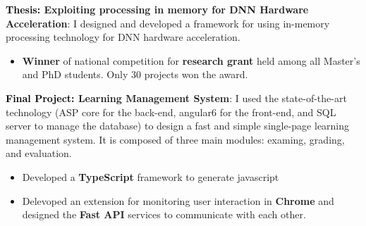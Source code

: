 \documentclass[10pt,a4paper,ragged2e,withhyper]{files/altacv}
\begin{document}
\begin{paracol}{2}


    \textbf{\textcolor{3}{Thesis:} Exploiting processing in memory for DNN Hardware Acceleration}: I designed and developed a framework for using in-memory processing technology for DNN hardware acceleration.
    
\begin{itemize}    
    \item \textbf{Winner} of national competition for \textbf{research grant} held among all Master's and PhD students. Only 30 projects won the award.
    
\end{itemize}
\divider


    \textbf{\textcolor{3}{Final Project:} Learning Management System}: I used the state-of-the-art technology (ASP core for the back-end, angular6 for the front-end, and SQL server to manage the database) to design a fast and simple single-page learning management system. It is composed of three main modules: examing, grading, and evaluation.





\begin{itemize}

\item Developed a \textbf{TypeScript} framework to generate javascript
\item Delevoped an extension for monitoring user interaction in \textbf{ Chrome } and designed the \textbf{Fast API} services to communicate with each other. 




\end{itemize}

\divider 

\begin{itemize}


\end{itemize}
\end{paracol}
\end{document}
